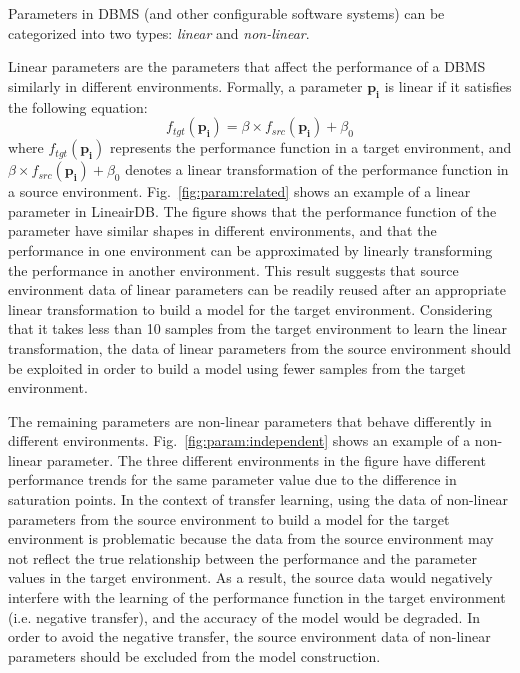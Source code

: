 Parameters in DBMS (and other configurable software systems) can be categorized into two types: \textit{linear} and \textit{non-linear}.

Linear parameters are the parameters that affect the performance of a DBMS similarly in different environments.
Formally, a parameter $\boldsymbol{p_i}$ is linear if it satisfies the following equation:
\begin{equation}
    f_{tgt}(\boldsymbol{p_i}) = \beta{\times}f_{src}(\boldsymbol{p_i})+\beta_0\label{linear}
\end{equation}
where $f_{tgt}(\boldsymbol{p_i})$ represents the performance function in a target environment, and $\beta{\times}f_{src}(\boldsymbol{p_i})+\beta_0$ denotes a linear transformation of the performance function in a source environment.
Fig.~\ref{fig:param:related} shows an example of a linear parameter in LineairDB.
The figure shows that the performance function of the parameter have similar shapes in different environments, and that the performance in one environment can be approximated by linearly transforming the performance in another environment.
This result suggests that source environment data of linear parameters can be readily reused after an appropriate linear transformation to build a model for the target environment.
Considering that it takes less than 10 samples from the target environment to learn the linear transformation\cite{Valov}, the data of linear parameters from the source environment should be exploited in order to build a model using fewer samples from the target environment.

The remaining parameters are non-linear parameters that behave differently in different environments.
Fig.~\ref{fig:param:independent} shows an example of a non-linear parameter.
The three different environments in the figure have different performance trends for the same parameter value due to the difference in saturation points.
In the context of transfer learning, using the data of non-linear parameters from the source environment to build a model for the target environment is problematic because the data from the source environment may not reflect the true relationship between the performance and the parameter values in the target environment.
As a result, the source data would negatively interfere with the learning of the performance function in the target environment (i.e. negative transfer), and the accuracy of the model would be degraded.
In order to avoid the negative transfer, the source environment data of non-linear parameters should be excluded from the model construction.

